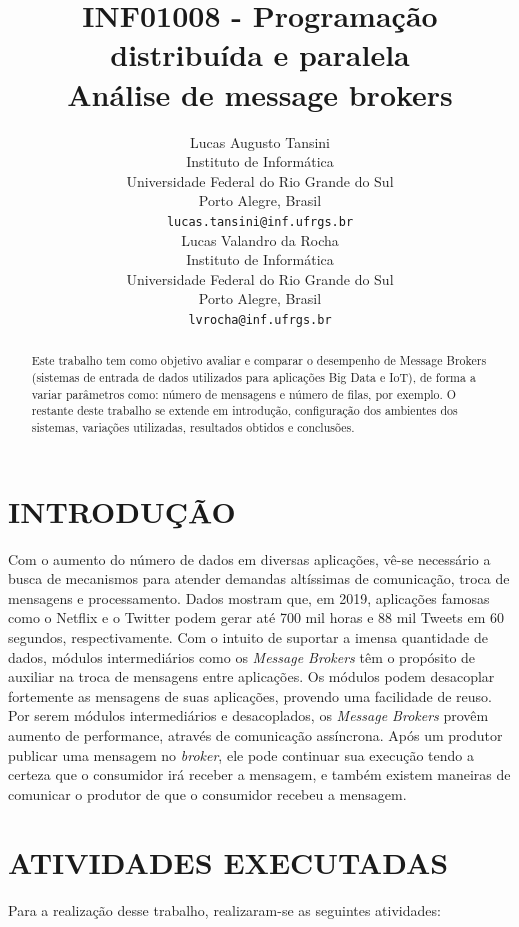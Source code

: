 \documentclass[letterpaper, 10 pt, conference]{ieeeconf}  %
\title{\bf INF01008 - Programação distribuída e paralela\\ Análise de message brokers}
\author{ \parbox{3 in}{\centering Lucas Augusto Tansini
        \\
        Instituto de Informática\\
        Universidade Federal do Rio Grande do Sul\\
        Porto Alegre, Brasil\\
        {\tt\small lucas.tansini@inf.ufrgs.br}}
        \hspace*{ 0.5 in}
        \parbox{3 in}{ \centering Lucas Valandro da Rocha\\
        Instituto de Informática \\
        Universidade Federal do Rio Grande do Sul\\
        Porto Alegre, Brasil\\
        {\tt\small lvrocha@inf.ufrgs.br}}
}
\begin{document}
\maketitle
\thispagestyle{empty}
\pagestyle{empty}


\begin{abstract}

Este trabalho tem como objetivo avaliar e comparar o desempenho de Message Brokers (sistemas
de entrada de dados utilizados para aplicações Big Data e IoT), de forma a variar parâmetros como: número de mensagens e número de filas, por exemplo. O restante deste trabalho se extende em introdução, configuração dos ambientes dos sistemas, variações utilizadas, resultados obtidos e conclusões.

\end{abstract}


\section{INTRODUÇÃO}

Com o aumento do número de dados em diversas aplicações, vê-se necessário a busca de mecanismos para atender demandas altíssimas de comunicação, troca de mensagens e processamento. Dados mostram que, em 2019, aplicações famosas como o Netflix e o Twitter podem gerar até 700 mil horas e 88 mil Tweets em 60 segundos, respectivamente. Com o intuito de suportar a imensa quantidade de dados, módulos intermediários como os \textit{Message Brokers} têm o propósito de auxiliar na troca de mensagens entre aplicações. Os módulos podem desacoplar fortemente as mensagens de suas aplicações, provendo uma facilidade de reuso. Por serem módulos intermediários e desacoplados, os \textit{Message Brokers} provêm aumento de performance, através de comunicação assíncrona. Após um produtor publicar uma mensagem no \textit{broker}, ele pode continuar sua execução tendo a certeza que o consumidor irá receber a mensagem, e também existem maneiras de comunicar o produtor de que o consumidor recebeu a mensagem.  

\section{ATIVIDADES EXECUTADAS}

Para a realização desse trabalho, realizaram-se as seguintes atividades:
\end{document}
